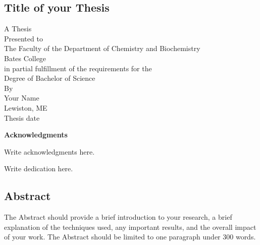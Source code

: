 \documentclass[12pt]{article}
\begin{document}
\begin{center}
\section*{Title of your Thesis}

A Thesis\\
Presented to\\
The Faculty of the Department of Chemistry and Biochemistry\\
Bates College\\
in partial fulfillment of the requirements for the\\
Degree of Bachelor of Science\\
\vspace{5mm}
By\\
Your Name\\
Lewiston, ME\\
Thesis date\\

\end{center}

\clearpage

\begin{center}
	\textbf{Acknowledgments}\\
\end{center}

Write acknowledgments here.

\clearpage


\begin{center}
	Write dedication here.
\end{center}

\clearpage

\tableofcontents

\clearpage

\listoffigures

\listoftables

\clearpage

\begin{center}
\subsection*{Abstract}
\end{center}
\noindent
The Abstract should provide a brief introduction to your research, a brief explanation of the techniques used, any important results, and the overall impact of your work. The Abstract should be limited to one paragraph under 300 words.

\pagebreak
\end{document}
